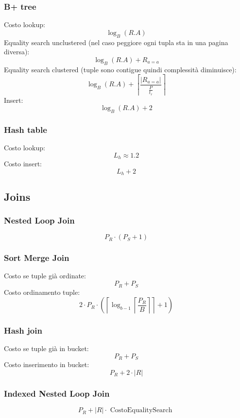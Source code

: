 \subsubsection*{B+ tree}
Costo lookup: 
\[
  \log_B \left(R.A\right)
\]
Equality search unclustered (nel caso peggiore ogni tupla sta in una pagina diversa): 
\[
  \log_B \left(R.A\right) + R_{a = a}
\]
Equality search clustered (tuple sono contigue quindi complessità diminuisce): 
\[
  \log_B \left(R.A\right) +\left\lceil \frac{\left|R_{a = a}\right|}{ \frac{P}{t_r}} \right\rceil 
\]
Insert: 
\[
  \log_B \left(R.A\right)  + 2
\]
\subsubsection*{Hash table}
Costo lookup: 
\[
L_h \approx 1.2
\]
Costo insert: 
\[
L_h + 2
\]


\subsection{Joins}
\subsubsection*{Nested Loop Join}
\[
  P_R  \cdot  \left(P_S + 1\right)
\]
\subsubsection*{Sort Merge Join}
Costo se tuple già ordinate: 
\[
P_R + P_S
\]
Costo ordinamento tuple: 
\[
  2 \cdot  P_R \cdot  \left(\left\lceil \log_{b-1} \left\lceil \frac{P_R}{B} \right\rceil \right\rceil + 1\right)
\]
\subsubsection*{Hash join}
Costo se tuple già in bucket: 
\[
P_R + P_S
\]
Costo inserimento in bucket: 
\[
  P_R + 2 \cdot \left|R\right|
\]
\subsubsection*{Indexed Nested Loop Join}
\[
P_R + \left|R\right| \cdot  \text{ CostoEqualitySearch }
\]


